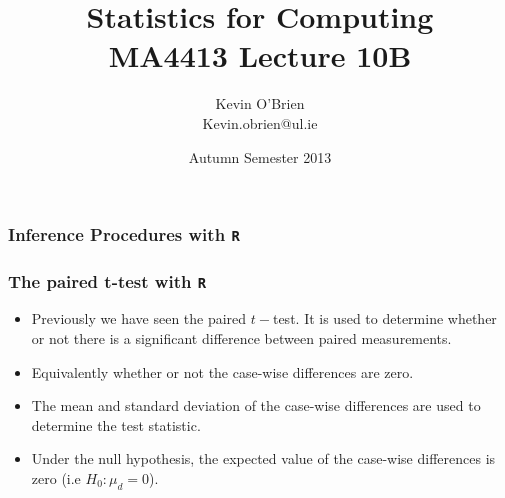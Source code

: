 \documentclass[a4]{beamer}
\title[MA4413]{Statistics for Computing \\ {\normalsize MA4413 Lecture 10B}}
\author[Kevin O'Brien]{Kevin O'Brien \\ {\scriptsize Kevin.obrien@ul.ie}}
\date{Autumn Semester 2013}
\institute[Maths \& Stats]{Dept. of Mathematics \& Statistics, \\ University \textit{of} Limerick}
\begin{document}
\begin{frame}
\titlepage
\end{frame}

\begin{frame}
\frametitle{Inference Procedures with \texttt{R}}
\end{frame}

\begin{frame}
\frametitle{The paired t-test with \texttt{R}}
\vspace{-1cm}
\begin{itemize}
\item Previously we have seen the paired $t-$test. It is used to determine whether or
not there is a significant difference between paired measurements. \item Equivalently whether or not
the case-wise differences are zero.
\item The mean and standard deviation of the case-wise differences are used to determine the test statistic.
\item Under the null hypothesis, the expected value of the case-wise differences is zero (i.e $H_0 : \mu_d = 0$).
\end{itemize}
\end{frame}
\end{document}

